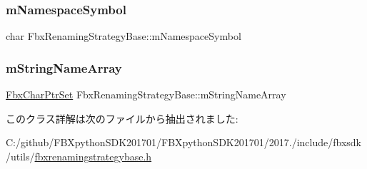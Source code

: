 \subsubsection{\texorpdfstring{m\+Namespace\+Symbol}{mNamespaceSymbol}}
{\footnotesize\ttfamily char Fbx\+Renaming\+Strategy\+Base\+::m\+Namespace\+Symbol}

\mbox{\label{class_fbx_renaming_strategy_base_a4cab3a7e42cbd982adc44841c38b02d0}} 
\subsubsection{\texorpdfstring{m\+String\+Name\+Array}{mStringNameArray}}
{\footnotesize\ttfamily \hyperlink{class_fbx_char_ptr_set}{Fbx\+Char\+Ptr\+Set} Fbx\+Renaming\+Strategy\+Base\+::m\+String\+Name\+Array}



このクラス詳解は次のファイルから抽出されました\+:\begin{DoxyCompactItemize}
\item 
C\+:/github/\+F\+B\+Xpython\+S\+D\+K201701/\+F\+B\+Xpython\+S\+D\+K201701/2017./include/fbxsdk/utils/\hyperlink{fbxrenamingstrategybase_8h}{fbxrenamingstrategybase.\+h}\end{DoxyCompactItemize}

